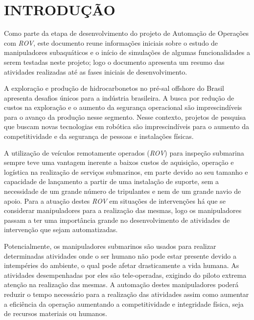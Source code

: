 \chapter{INTRODUÇÃO}
\label{chap:int}
Como parte da etapa de desenvolvimento do projeto de Automação de Operações com \textit{\acs{ROV}}, este documento reune informações iniciais sobre o estudo de manipuladores subaquáticos e o início de simulações de algumas funcionalidades a serem testadas neste projeto; logo o documento apresenta um resumo das atividades realizadas até as fases iniciais de desenvolvimento.


A exploração e produção de hidrocarbonetos no pré-sal offshore do Brasil apresenta desafios únicos para a indústria brasileira. A busca por redução de custos na exploração e o aumento da segurança operacional são imprescindíveis para o avanço da produção nesse segmento. Nesse contexto, projetos de pesquisa que buscam novas tecnologias em robótica são imprescindíveis para o aumento da competitividade e da segurança de pessoas e instalações físicas. 

A utilização de veículos remotamente operados (\textit{\acs{ROV}}) para inspeção submarina sempre teve uma vantagem inerente a baixos custos de aquisição, operação e logística na realização de serviços submarinos, em parte devido ao seu tamanho e capacidade de lançamento a partir de uma instalação de suporte, sem a necessidade de um grande número de tripulantes e nem de um grande navio de apoio. Para a atuação destes \textit{\acs{ROV}} em situações de intervenções há que se considerar manipuladores para a realização das mesmas, logo os manipuladores passam a ter uma importância grande no desenvolvimento de atividades de intervenção que sejam automatizadas.

Potencialmente, os manipuladores submarinos são usados para realizar determinadas atividades onde o ser humano não pode estar presente devido a intempéries do ambiente, o qual pode afetar drasticamente a vida humana. As atividades desempenhadas por eles são tele-operadas, exigindo do piloto extrema atenção na realização das mesmas. A automação destes manipuladores poderá reduzir o tempo necessário para a realização das atividades assim como aumentar a eficiência da operação aumentando a competitividade e integridade física, seja de recursos materiais ou humanos. 

